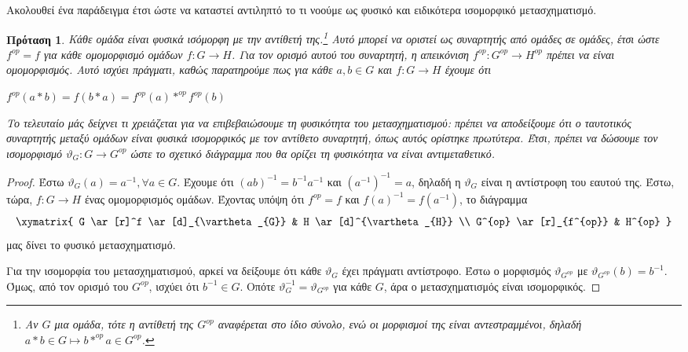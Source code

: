 \documentclass [a4paper,11pt] {book}
\newtheorem{proposition}[theorem]{Πρόταση}
\theoremstyle{definition}
\theoremstyle{definition}
\begin{document}
Ακολουθεί ένα παράδειγμα έτσι ώστε να καταστεί αντιληπτό το τι νοούμε ως φυσικό και ειδικότερα ισομορφικό μετασχηματισμό.
\begin{proposition}\label{naturalIsomorpismExample}
Κάθε ομάδα είναι φυσικά ισόμορφη με την αντίθετή της.\footnote{Αν $G$ μια ομάδα, τότε η αντίθετή της $G^{op}$ αναφέρεται στο ίδιο σύνολο, ενώ οι μορφισμοί της είναι αντεστραμμένοι, δηλαδή $a \ast b \in G \mapsto b \ast^{op} a \in G^{op}$.} Αυτό μπορεί να οριστεί ως συναρτητής από ομάδες σε ομάδες, έτσι ώστε $f^{op}=f$ για κάθε ομομορφισμό ομάδων $f: G \to H$. Για τον ορισμό αυτού του συναρτητή, η απεικόνιση $f^{op}: G^{op} \to H^{op}$ πρέπει να είναι ομομορφισμός. Αυτό ισχύει πράγματι, καθώς παρατηρούμε πως για κάθε $a,b \in G$ και $f: G \to H$ έχουμε ότι
\begin{center}
$f^{op}(a\ast b)=f(b\ast a)=f^{op}(a) \ast^{op} f^{op}(b)$
\end{center}
Το τελευταίο μάς δείχνει τι χρειάζεται για να επιβεβαιώσουμε τη φυσικότητα του μετασχηματισμού: πρέπει να αποδείξουμε ότι ο ταυτοτικός συναρτητής μεταξύ ομάδων είναι φυσικά ισομορφικός με τον αντίθετο συναρτητή, όπως αυτός ορίστηκε πρωτύτερα. Έτσι, πρέπει να δώσουμε τον ισομορφισμό $\vartheta_{G}:G\to G^{op}$ ώστε το σχετικό διάγραμμα που θα ορίζει τη φυσικότητα να είναι αντιμεταθετικό.
\end{proposition}
\begin{proof}
Έστω $\vartheta_{G}(a)=a^{-1}, \forall a \in G$. Έχουμε ότι $(ab)^{-1}=b^{-1}a^{-1}$ και $(a^{-1})^{-1}=a$, δηλαδή η $\vartheta_{G}$ είναι η αντίστροφη του εαυτού της. Έστω, τώρα, $f: G \to H$ ένας ομομορφισμός ομάδων. Έχοντας υπόψη ότι $f^{op}=f$ και $f(a)^{-1}=f(a^{-1})$, το διάγραμμα
\begin{displaymath}
\xymatrix{
G \ar[r]^f \ar[d]_{\vartheta_{G}} & H \ar[d]^{\vartheta_{H}} \\
G^{op} \ar[r]_{f^{op}} & H^{op}
}
\end{displaymath}
μας δίνει το φυσικό μετασχηματισμό.

Για την ισομορφία του μετασχηματισμού, αρκεί να δείξουμε ότι κάθε $\vartheta_{G}$ έχει πράγματι αντίστροφο. Έστω ο μορφισμός $\vartheta_{G^{op}}$ με $\vartheta_{G^{op}}(b)=b^{-1}$. Όμως, από τον ορισμό του $G^{op}$, ισχύει ότι $b^{-1}\in G$. Οπότε $\vartheta_{G}^{-1}=\vartheta_{G^{op}}$ για κάθε $G$, άρα ο μετασχηματισμός είναι ισομορφικός.
\end{proof}
\end{document}
